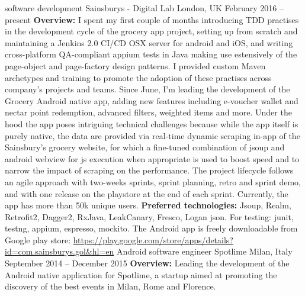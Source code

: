 \begin{cventries}
\cventry
{software development}
{Sainsburys - Digital Lab}
{London, UK}
{February 2016 -- present}
{%
   \textbf{Overview:}
   I spent my first couple  of months introducing TDD practises in the
   development cycle of the 
   grocery app project, 
   setting up from scratch and maintaining a Jenkins 2.0  CI/CD
   OSX server for android and iOS, and writing cross-platform QA-compliant
   appium tests in Java making use estensively of the page-object and
   page-factory design patterns. 
    I provided custom Maven archetypes and training to promote the adoption of
    these practises across company's projects and teams. 
   Since June, I'm leading the development of the Grocery Android native
   app, adding new features including e-voucher wallet and nectar point
   redemption, advanced filters, weighted items
   and more. 
   Under the hood the app poses intriguing technical challenges because while
   the app itself is purely native, the data are provided via 
   real-time dynamic scraping  in-app of the Sainsbury's grocery website, for which
   a fine-tuned combination of jsoup and android webview for js execution when
   appropriate is used to boost speed and to narrow the impact of scraping
   on the performance. 
   The project lifecycle follows an agile approach with two-weeks sprints,
   sprint planning, retro and sprint demo,  and
   with one 
    release on the playstore at the end of each sprint. 
    Currently, the app has 
    more than 
    50k unique users.
   \newline
    \textbf{Preferred technologies:} Jsoup, Realm, Retrofit2, Dagger2, RxJava,
   LeakCanary, Fresco, Logan json. For testing: junit, testng, appium, espresso,
    mockito.
   \newline
   The Android app is freely downloadable from Google play store: 
   \url{https://play.google.com/store/apps/details?id=com.sainsburys.gol&hl=en}
}
\cventry
{Android software engineer}
{Spotlime}
{Milan, Italy}
{September 2014 -- December 2015 }
{
   \textbf{Overview:}
   Leading the 
   development of the 
   Android native application for 
   Spotlime, a startup aimed  at promoting  the 
   discovery of the best events in Milan, Rome and Florence. 
}
\end{cventries}
